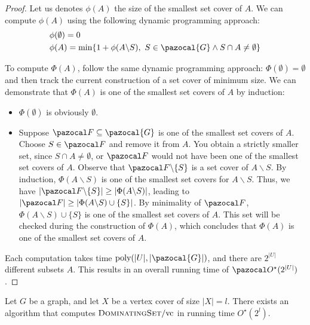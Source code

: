 \begin{proof}
    Let us denotes $\phi(A)$ the size of the smallest set cover of $A$. We can compute $\phi(A)$ using the following dynamic programming approach:
    \begin{align*}
        &\phi(\emptyset) = 0\\
        &\phi(A) = \min\{1 + \phi(A \backslash S),\ S \in \pazocal{G} \land S \cap A \neq \emptyset\}
    \end{align*}
    
    To compute $\Phi(A)$, follow the same dynamic programming approach: $\Phi(\emptyset) = \emptyset$ and then track the current construction of a set cover of minimum size. We can demonstrate that $\Phi(A)$ is one of the smallest set covers of $A$ by induction:
    \begin{itemize}
        \item $\Phi(\emptyset)$ is obviously $\emptyset$.
        \item Suppose $\F \subseteq \pazocal{G}$ is one of the smallest set covers of $A$. Choose $S \in \F$ and remove it from $A$. You obtain a strictly smaller set, since $S \cap A \neq \emptyset$, or $\F$ would not have been one of the smallest set covers of $A$. Observe that $\F \backslash \{S\}$ is a set cover of $A \backslash S$. By induction, $\Phi(A \backslash S)$ is one of the smallest set covers for $A \backslash S$. Thus, we have $|\F \backslash \{S\}| \geq |\Phi(A \backslash S)|$, leading to $|\F| \geq |\Phi(A \backslash S) \cup \{S\}|$. By minimality of $\F$, $\Phi(A \backslash S) \cup \{S\}$ is one of the smallest set covers of $A$. This set will be checked during the construction of $\Phi(A)$, which concludes that $\Phi(A)$ is one of the smallest set covers of $A$.
    \end{itemize}
    
    Each computation takes time $\poly(|U|, |\pazocal{G}|)$, and there are $2^{|U|}$ different subsets $A$. This results in an overall running time of $\O^\star(2^{|U|})$.
\end{proof}



\begin{theorem}
    \label{theorem:domset-vc}
    Let $G$ be a graph, and let $X$ be a vertex cover of size $|X| = l$. There exists an algorithm that computes $\textsc{DominatingSet}/\text{vc}$ in running time $O^\star(2^l)$.
\end{theorem}

